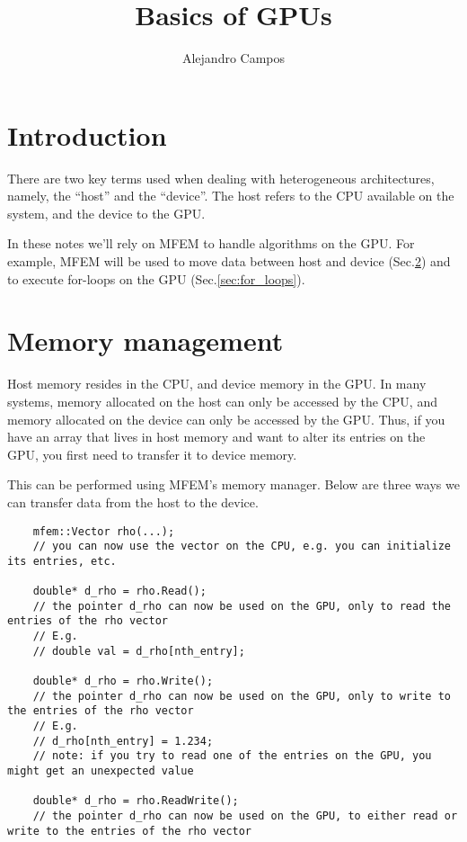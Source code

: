 \documentclass[a4paper,11pt]{article}
\title{Basics of GPUs}
\author{Alejandro Campos}
\begin{document}
\maketitle
\tableofcontents

\section{Introduction}
There are two key terms used when dealing with heterogeneous architectures, namely, the ``host'' and the ``device''. The host refers to the CPU available on the system, and the device to the GPU. 

In these notes we'll rely on MFEM to handle algorithms on the GPU. For example, MFEM will be used to move data between host and device (Sec.\@ \ref{sec:memory_management}) and to execute for-loops on the GPU (Sec.\@ \ref{sec:for_loops}).

\section{Memory management}
\label{sec:memory_management}
Host memory resides in the CPU, and device memory in the GPU. In many systems, memory allocated on the host can only be accessed by the CPU, and memory allocated on the device can only be accessed by the GPU. Thus, if you have an array that lives in host memory and want to alter its entries on the GPU, you first need to transfer it to device memory.

This can be performed using MFEM's memory manager. Below are three ways we can transfer data from the host to the device.
\begin{lstlisting}
    mfem::Vector rho(...);
    // you can now use the vector on the CPU, e.g. you can initialize its entries, etc.

    double* d_rho = rho.Read();
    // the pointer d_rho can now be used on the GPU, only to read the entries of the rho vector
    // E.g.
    // double val = d_rho[nth_entry];

    double* d_rho = rho.Write();
    // the pointer d_rho can now be used on the GPU, only to write to the entries of the rho vector
    // E.g.
    // d_rho[nth_entry] = 1.234;
    // note: if you try to read one of the entries on the GPU, you might get an unexpected value

    double* d_rho = rho.ReadWrite();
    // the pointer d_rho can now be used on the GPU, to either read or write to the entries of the rho vector
\end{lstlisting}
\end{document}
